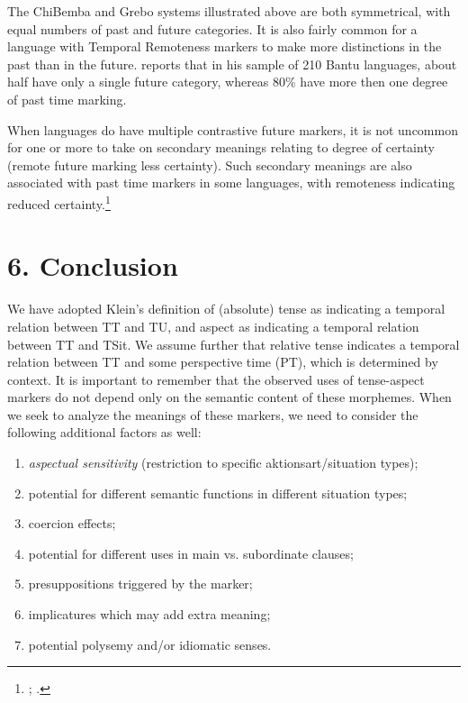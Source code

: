 The ChiBemba and Grebo systems illustrated above are both symmetrical, with equal numbers of past and future categories. It is also fairly common for a language with Temporal Remoteness markers to make more distinctions in the past than in the future. \citet{Nurse2008} reports that in his sample of 210 Bantu languages, about half have only a single future category, whereas 80\% have more then one degree of past time marking. 



When languages do have multiple contrastive future markers, it is not uncommon for one or more to take on secondary meanings relating to degree of certainty (remote future marking less certainty). Such secondary meanings are also associated with past time markers in some languages, with remoteness indicating reduced certainty.\footnote{\citet{Botne2012}; \citet{Nurse2008}.}


\section{6. Conclusion}\label{sec:}

We have adopted Klein’s definition of (absolute) tense as indicating a temporal relation between TT and TU, and aspect as indicating a temporal relation between TT and TSit. We assume further that relative tense indicates a temporal relation between TT and some perspective time (PT), which is determined by context. It is important to remember that the observed uses of tense-aspect markers do not depend only on the semantic content of these morphemes. When we seek to analyze the meanings of these markers, we need to consider the following additional factors as well:


\begin{enumerate}
\item 
\textit{aspectual sensitivity} (restriction to specific aktionsart/situation types);
\item 
potential for different semantic functions in different situation types;
\item 
coercion effects;
\item 
potential for different uses in main vs. subordinate clauses;
\item 
presuppositions triggered by the marker;
\item 
implicatures which may add extra meaning;
\item 
potential polysemy and/or idiomatic senses.
\end{enumerate}

